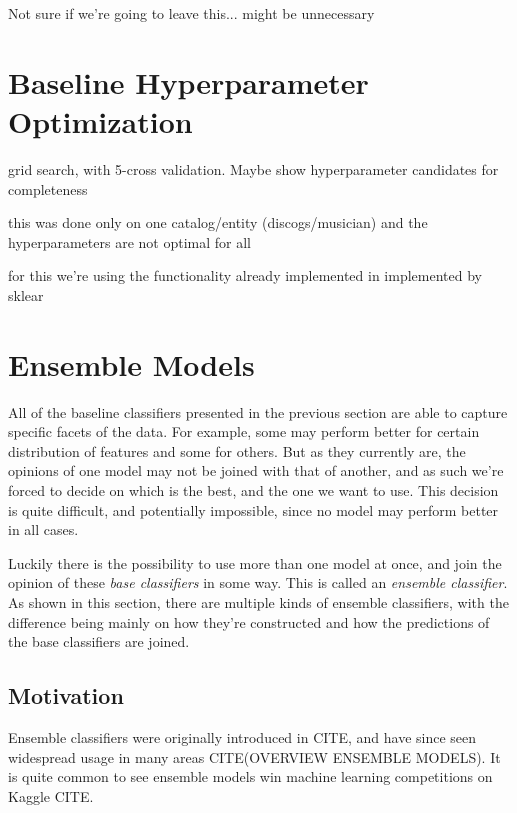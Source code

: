 \documentclass[epsfig,a4paper,11pt,titlepage,twoside,openany]{book}
\begin{document}
Not sure if we're going to leave this... might be unnecessary

\section{Baseline Hyperparameter Optimization}
\label{sec:hyperpar-optimization}

grid search, with 5-cross validation. Maybe show hyperparameter candidates for
completeness

this was done only on one catalog/entity (discogs/musician) and the
hyperparameters are not optimal for all

for this we're using the functionality already implemented in implemented by sklear \cite{scikit-learn}


\section{Ensemble Models}
\label{sec:ensemble-models}

All of the baseline classifiers presented in the previous section are able to capture specific facets of the data. For example, some may perform better for certain distribution of features and some for others. But as they currently are, the opinions of one model may not be joined with that of another, and as such we're forced to decide on which is the best, and the one we want to use. This decision is quite difficult, and potentially impossible, since no model may perform better in all cases. 

Luckily there is the possibility to use more than one model at once, and join the opinion of these \textit{base classifiers} in some way. This is called an \textit{ensemble classifier}. As shown in this section, there are multiple kinds of ensemble classifiers, with the difference being mainly on how they're constructed and how the predictions of the base classifiers are joined.



\subsection{Motivation} 
\label{sec:motivation-ensemble}

Ensemble classifiers were originally introduced in CITE, and have since seen widespread usage in many areas CITE(OVERVIEW ENSEMBLE MODELS). It is quite common to see ensemble models win machine learning competitions on Kaggle CITE. 
\end{document}
